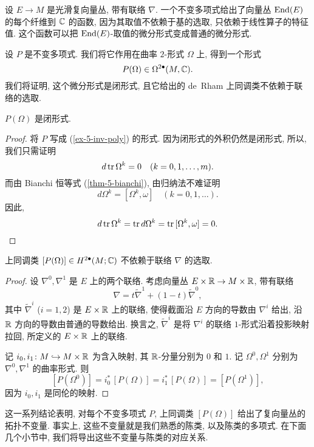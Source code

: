 设 $E \to M$ 是光滑复向量丛, 带有联络 $\nabla$.
一个不变多项式给出了向量丛 $\operatorname{End} (E)$ 的每个纤维到 $\mathbb{C}$ 的函数,
因为其取值不依赖于基的选取, 只依赖于线性算子的特征值.
这个函数可以把 $\operatorname{End} (E)$-取值的微分形式变成普通的微分形式.

设 $P$ 是不变多项式. 我们将它作用在曲率 $2$-形式 $\Omega$ 上, 得到一个形式
\[ P (\Omega) \in \Omega^{2 \bullet} (M, \mathbb{C}). \]
我们将证明, 这个微分形式是闭形式, 且它给出的 de~Rham 上同调类不依赖于联络的选取.

\begin{proposition}
    $P (\Omega)$ 是闭形式.
\end{proposition}

\begin{proof}
    将 $P$ 写成 (\ref{ex-5-inv-poly}) 的形式.
    因为闭形式的外积仍然是闭形式, 所以, 我们只需证明
    \[ d \operatorname{tr} \Omega^k = 0 \quad (k = 0, 1, \dotsc, m). \]
    而由 Bianchi 恒等式 (\ref{thm-5-bianchi}), 由归纳法不难证明
    \[ d \Omega^k = [ \Omega^k, \omega ] \quad (k = 0, 1, \dotsc). \]
    因此,
    \[ d \operatorname{tr} \Omega^k = \operatorname{tr} d \Omega^k
        = \operatorname{tr} {} [ \Omega^k, \omega ] = 0. \qedhere \]
\end{proof}

\begin{proposition} \label{thm-5-conn-indep}
    上同调类 $[P (\Omega)] \in H^{2 \bullet} (M; \mathbb{C})$
    不依赖于联络 $\nabla$ 的选取.
\end{proposition}

\begin{proof}
    设 $\nabla^0, \nabla^1$ 是 $E$ 上的两个联络.
    考虑向量丛 $E \times \mathbb{R} \to M \times \mathbb{R}$, 带有联络
    \[ \nabla = t \widetilde{\nabla} ^1 + (1-t) \widetilde{\nabla} ^0, \]
    其中 $\widetilde{\nabla} ^i$ ($i = 1, 2$)
    是 $E \times \mathbb{R}$ 上的联络,
    使得截面沿 $E$ 方向的导数由 $\nabla^i$ 给出, 
    沿 $\mathbb{R}$ 方向的导数由普通的导数给出.
    换言之, $\widetilde{\nabla} ^i$ 是将
    $\nabla^i$ 的联络 $1$-形式沿着投影映射拉回,
    所定义的 $E \times \mathbb{R}$ 上的联络.
    
    记 $i_0, i_1 \colon M \hookrightarrow M \times \mathbb{R}$ 为含入映射,
    其 $\mathbb{R}$-分量分别为 $0$ 和 $1$. 记 $\Omega^0, \Omega^1$
    分别为 $\nabla^0, \nabla^1$ 的曲率形式. 则
    \[ [ P (\Omega^0) ] = i_0^* \, [ P (\Omega) ]
        = i_1^* \, [ P (\Omega) ] = [ P (\Omega^1) ], \]
    因为 $i_0, i_1$ 是同伦的映射.
\end{proof}

这一系列结论表明, 对每个不变多项式 $P$,
上同调类 $[ P (\Omega) ]$ 给出了复向量丛的拓扑不变量.
事实上, 这些不变量就是我们熟悉的陈类, 以及陈类的多项式.
在下面几个小节中, 我们将导出这些不变量与陈类的对应关系.


